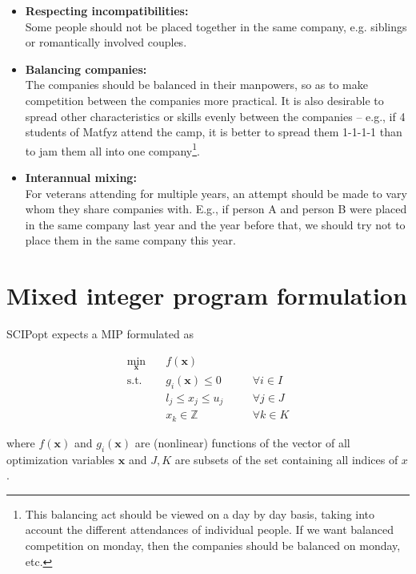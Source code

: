 \documentclass[11pt]{article}
\begin{document}
\begin{itemize}
    \item 
    \textbf{Respecting incompatibilities:}\\
    Some people should not be placed together in the same company, e.g. siblings or romantically involved couples.

    \item
    \textbf{Balancing companies:}\\
    The companies should be balanced in their manpowers, so as to make competition between the companies more practical.  It is also desirable to spread
    other characteristics or skills evenly between the companies -- e.g., if 4 students of Matfyz attend the camp, it is better to spread them 1-1-1-1 than
    to jam them all into one company\footnote{
    This balancing act should be viewed on a day by day basis, taking into account the different attendances of individual people.  If we want balanced
    competition on monday, then the companies should be balanced on monday, etc.}.

    \item
    \textbf{Interannual mixing:}\\
    For veterans attending for multiple years, an attempt should be made to vary whom they share companies with.  E.g., if person A and person B were placed 
    in the same company last year and the year before that, we should try not to place them in the same company this year.
\end{itemize}


\section{Mixed integer program formulation}

SCIPopt expects a MIP formulated as

\begin{equation}
\begin{alignedat}{2}
\underset{\mathbf{x}}{\text{min}} \quad & f(\mathbf{x})  \\ 
\text{s.t.} \quad & g_i(\mathbf{x}) \leq 0  &&\forall i \in I\\
& l_j \leq x_j \leq u_j \quad &&\forall j \in J \\
& x_k \in \mathbb{Z} &&\forall k \in K
\end{alignedat}
\tag{MIP formulation}
\label{MIP}
\end{equation}

where $f(\mathbf{x})$ and $g_i(\mathbf{x})$ are (nonlinear) functions of the vector of all optimization variables $\mathbf{x}$ and $J,K$ are subsets of 
the set containing all indices of $x$.  
\end{document}
